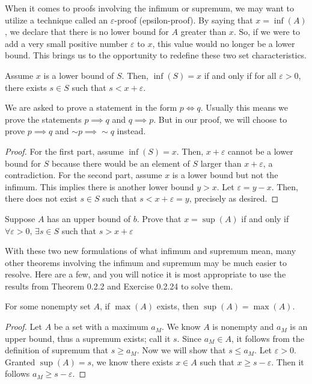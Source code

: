 When it comes to proofs involving the infimum or supremum, we may want to utilize a technique called an $\varepsilon$-proof (epsilon-proof). By saying that $x=\inf(A)$, we declare that there is no lower bound for $A$ greater than $x$. So, if we were to add a very small positive number $\varepsilon$ to $x$, this value would no longer be a lower bound. This brings us to the opportunity to redefine these two set characteristics. \\

\begin{theorem}
    Assume $x$ is a lower bound of $S$. Then, $\inf(S)=x$ if and only if for all $\varepsilon>0$, there exists $s\in S$ such that $s<x+\varepsilon$.
\end{theorem}

We are asked to prove a statement in the form $p\iff q$. Usually this means we prove the statements $p\implies q$ and $q \implies p$. But in our proof, we will choose to prove $p\implies q$ and $\sim p \implies \sim q$ instead. 

\begin{proof}
     For the first part, assume $\inf(S)=x$. Then, $x+\varepsilon$ cannot be a lower bound for $S$ because there would be an element of $S$ larger than $x+\varepsilon$, a contradiction. For the second part, assume $x$ is a lower bound but not the infimum. This implies there is another lower bound $y>x$. Let $\varepsilon=y-x$. Then, there does not exist $s\in S$ such that $s<x+\varepsilon=y$, precisely as desired. 
\end{proof}

\begin{exercise}
    Suppose $A$ has an upper bound of $b$. Prove that $x=\sup(A)$ if and only if $\forall\varepsilon>0,\, \exists s\in S$ such that $s>x+\varepsilon$
\end{exercise}

With these two new formulations of what infimum and supremum mean, many other theorems involving the infimum and supremum may be much easier to resolve. Here are a few, and you will notice it is most appropriate to use the results from Theorem 0.2.2 and Exercise 0.2.24 to solve them. \\

\begin{theorem}
    For some nonempty set $A$, if $\max(A)$ exists, then $\sup(A)=\max(A)$. 
\end{theorem}
\begin{proof}
    Let $A$ be a set with a maximum $a_M$. We know $A$ is nonempty and $a_M$ is an upper bound, thus a supremum exists; call it $s$. Since $a_M\in A$, it follows from the definition of supremum that $s\geq a_M$. Now we will show that $s\leq a_M$. Let $\varepsilon >0$. Granted $\sup(A)=s$, we know there exists $x\in A$ such that $x\geq s-\varepsilon$. Then it follows $a_M \geq s-\varepsilon$.
\end{proof}

